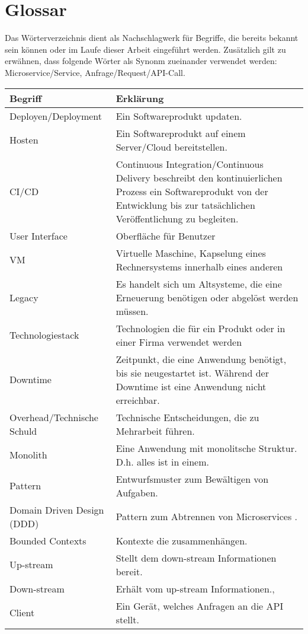 \section{Glossar}

Das Wörterverzeichnis dient als Nachschlagwerk für Begriffe, die bereits bekannt sein können oder im Laufe dieser Arbeit eingeführt werden. Zusätzlich gilt zu erwähnen, dass folgende Wörter als Synonm zueinander verwendet werden: Microservice/Service, Anfrage/Request/API-Call. 

\begin{longtable}{lp{10cm}}
	Begriff & Erklärung \\ \hline
	Deployen/Deployment & Ein Softwareprodukt updaten.  \\
	Hosten & Ein Softwareprodukt auf einem Server/Cloud bereitstellen. \\
	CI/CD & Continuous Integration/Continuous Delivery beschreibt den kontinuierlichen Prozess ein Softwareprodukt von der Entwicklung bis zur tatsächlichen Veröffentlichung zu begleiten.\\
	User Interface  & Oberfläche für Benutzer  \\
	VM & Virtuelle Maschine, Kapselung eines Rechnersystems innerhalb eines anderen  \\
	Legacy & Es handelt sich um Altsysteme, die eine Erneuerung benötigen oder abgelöst werden müssen. \\
	Technologiestack & Technologien die für ein Produkt oder in einer Firma verwendet werden  \\
	Downtime & Zeitpunkt, die eine Anwendung benötigt, bis sie neugestartet ist. Während der Downtime ist eine Anwendung nicht erreichbar.  \\
	Overhead/Technische Schuld & Technische Entscheidungen, die zu Mehrarbeit führen. \\
	Monolith & Eine Anwendung mit monolitsche Struktur. D.h. alles ist in einem. \\ 
	Pattern & Entwurfsmuster zum Bewältigen von Aufgaben.\\
	Domain Driven Design (DDD) & Pattern zum Abtrennen von Microservices .\\ 
	Bounded Contexts & Kontexte die zusammenhängen. \\
	Up-stream & Stellt dem down-stream Informationen bereit. \\
	Down-stream & Erhält vom up-stream Informationen., \\
	Client & Ein Gerät, welches Anfragen an die API stellt. \\

\end{longtable}
